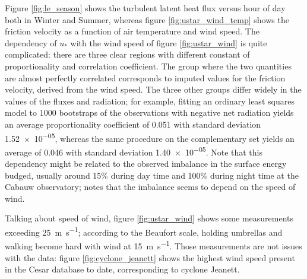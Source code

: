\documentclass[12pt]{book}
\begin{document}
Figure \ref{fig:le_season} shows the turbulent latent heat flux versus hour of day both in Winter and Summer, whereas figure \ref{fig:ustar_wind_temp} shows the friction velocity as a function of air temperature and wind speed. The dependency of $u_*$ with the wind speed of figure \ref{fig:ustar_wind} is quite complicated: there are three clear regions with different constant of proportionality and correlation coefficient. The group where the two quantities are almost perfectly correlated corresponds to imputed values for the friction velocity, derived from the wind speed. The three other groups differ widely in the values of the fluxes and radiation; for example, fitting an ordinary least squares model to 1000 bootstraps of the observations with negative net radiation yields an average proportionality coefficient of \num{0.051} with standard deviation \num{1.52e-05}, whereas the same procedure on the complementary set yields an average of \num{0.046} with standard deviation \num{1.40e-05}. Note that this dependency might be related to the observed imbalance in the surface energy budged, usually around 15\% during day time and 100\% during night time at the Cabauw observatory; \cite{cabauwinsitu} notes that the imbalance seems to depend on the speed of wind.

Talking about speed of wind, figure \ref{fig:ustar_wind} shows some measurements exceeding \SI{25}{\meter\per\second}; according to the Beaufort scale, holding umbrellas and walking become hard with wind at \SI{15}{\meter\per\second}. Those measurements are not issues with the data: figure \ref{fig:cyclone_jeanett} shows the highest wind speed present in the Cesar database to date, corresponding to cyclone Jeanett.
\end{document}
